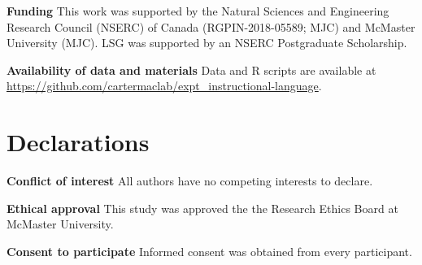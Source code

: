 \documentclass[man,floatsintext,donotrepeattitle,letterpaper,12pt]{apa7}
\begin{document}
\noindent \textbf{Funding} \hspace{0.25em} This work was supported by the Natural Sciences and Engineering Research Council (NSERC) of Canada (RGPIN-2018-05589; MJC) and McMaster University (MJC). LSG was supported by an NSERC Postgraduate Scholarship.

\noindent \textbf{Availability of data and materials} \hspace{0.25em} Data and R scripts are available at \url{https://github.com/cartermaclab/expt_instructional-language}.

\section{Declarations}

\noindent \textbf{Conflict of interest} \hspace{0.25em} All authors have no competing interests to declare.

\noindent \noindent \textbf{Ethical approval} \hspace{0.25em} This study was approved the the Research Ethics Board at McMaster University.

\noindent \textbf{Consent to participate} \hspace{0.25em} Informed consent was obtained from every participant.



\printbibliography
\end{document}

